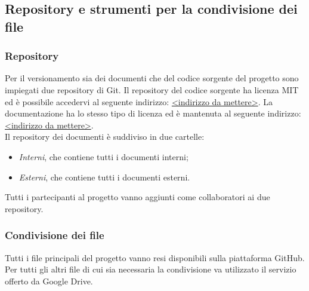 \subsection{Repository e strumenti per la condivisione dei file}
\subsubsection{Repository}
Per il versionamento sia dei documenti che del codice sorgente del progetto sono impiegati due repository di Git. Il repository del codice sorgente ha licenza MIT ed è possibile accedervi al seguente indirizzo: \url{<indirizzo da mettere>}.
La documentazione ha lo stesso tipo di licenza ed è mantenuta al seguente indirizzo: \url{<indirizzo da mettere>}.\\
Il repository dei documenti è suddiviso in due cartelle: 
\begin{itemize}
	\item \textit{Interni}, che contiene tutti i documenti interni;
	\item \textit{Esterni}, che contiene tutti i documenti esterni.
\end{itemize}
Tutti i partecipanti al progetto vanno aggiunti come collaboratori ai due repository.

\subsubsection{Condivisione dei file}
Tutti i file principali del progetto vanno resi disponibili sulla piattaforma GitHub. Per tutti gli altri file di cui sia necessaria la condivisione va utilizzato il servizio offerto da Google Drive.

